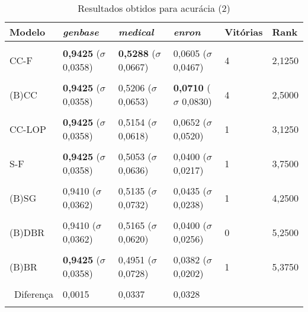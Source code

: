 \begin{table}[htbp]
	\centering
	\caption{Resultados obtidos para acurácia (2)}
		\begin{tabular}
        { p{0.88in} p{0.88in} p{0.88in} p{0.88in} p{0.88in} p{0.88in} }
        
        \hline
Modelo & \textit{genbase} & \textit{medical} & \textit{enron} & \textbf{Vitórias} & \textbf{Rank} \\ 
\hline \\

CC-F & \textbf{0,9425} \newline ($\sigma$ 0,0358) & \textbf{0,5288} \newline ($\sigma$ 0,0667) & 0,0605 \newline ($\sigma$ 0,0467) & 4 & 2,1250 \\ \\
(B)CC & \textbf{0,9425} \newline ($\sigma$ 0,0358) & 0,5206 \newline ($\sigma$ 0,0653) & \textbf{0,0710} \newline ($\sigma$ 0,0830) & 4 & 2,5000 \\ \\
CC-LOP & \textbf{0,9425} \newline ($\sigma$ 0,0358) & 0,5154 \newline ($\sigma$ 0,0618) & 0,0652 \newline ($\sigma$ 0,0520) & 1 & 3,1250 \\ \\
S-F & \textbf{0,9425} \newline ($\sigma$ 0,0358) & 0,5053 \newline ($\sigma$ 0,0636) & 0,0400 \newline ($\sigma$ 0,0217) & 1 & 3,7500 \\ \\
(B)SG & 0,9410 \newline ($\sigma$ 0,0362) & 0,5135 \newline ($\sigma$ 0,0732) & 0,0435 \newline ($\sigma$ 0,0238) & 1 & 4,2500 \\ \\
(B)DBR & 0,9410 \newline ($\sigma$ 0,0362) & 0,5165 \newline ($\sigma$ 0,0620) & 0,0400 \newline ($\sigma$ 0,0256) & 0 & 5,2500 \\ \\
(B)BR & \textbf{0,9425} \newline ($\sigma$ 0,0358) & 0,4951 \newline ($\sigma$ 0,0728) & 0,0382 \newline ($\sigma$ 0,0202) & 1 & 5,3750 \\ \\

\hline \ 
 Diferença & 0,0015 & 0,0337 & 0,0328 &  &  \\ 
\hline \\

        \end{tabular}
	\label{tab:metricsForAccuracy_2}
\end{table}
